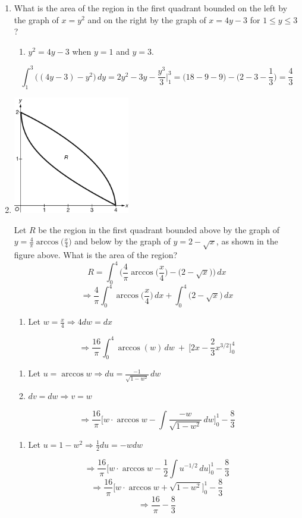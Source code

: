 \documentclass[12pt]{article}
\begin{document}
\begin{enumerate}
    \item What is the area of the region in the first quadrant bounded on the left by the graph of $x=y^2$ and on the right by the graph of $x=4y-3$ for $1\leq y \leq3$?
    \begin{enumerate}
        \item $y^2=4y-3$ when $y=1$ and $y=3$.
    \end{enumerate}
    $$\int_{1}^{3} \big((4y-3)-y^2\big) \, dy = 2y^2-3y-\frac{y^3}{3}\biggr\rvert_{1}^{3} = \biggr(18-9-9\biggr) - \biggr(2-3-\frac{1}{3}\biggr) = \boxed{\frac{4}{3}}$$
    \item 
    \begin{center}
        \includegraphics[width=2in]{4.011.png}
    \end{center}
    Let $R$ be the region in the first quadrant bounded above by the graph of $y=\frac{4}{\pi}\arccos\big( \frac{x}{4}\big)$ and below by the graph of $y=2-\sqrt{x}$, as shown in the figure above. What is the area of the region?
    $$R = \int_{0}^{4} \biggr(\frac{4}{\pi}\arccos\biggr( \frac{x}{4}\biggr) - \big(2-\sqrt{x}\big) \biggr) \, dx$$
$$\Longrightarrow \frac{4}{\pi}\int_{0}^{4} \arccos\biggr( \frac{x}{4}\biggr) \, dx + \int_{0}^{4} \big(2-\sqrt{x}\big) \, dx$$
\begin{enumerate}
    \item Let $w=\frac{x}{4} \Longrightarrow 4 dw=dx$
\end{enumerate}
$$\Longrightarrow \frac{16}{\pi}\int_{0}^{4} \arccos (w) \, dw \: + \: \biggr[2x-\frac{2}{3}x^{3/2} \biggr]_{0}^{4}$$
\begin{enumerate}[resume]
    \item Let $u=\arccos w \Longrightarrow  du=\frac{-1}{\sqrt{1-w^2}} \, dw$
    \item $dv=dw \Longrightarrow v=w$
\end{enumerate}
$$\Longrightarrow \frac{16}{\pi}\biggr[w \cdot \arccos w - \int \frac{-w}{\sqrt{1-w^2}} \, dw  \biggr]_{0}^{1} - \frac{8}{3}$$
\begin{enumerate}[resume]
\item Let $u= 1-w^2 \Longrightarrow \frac{1}{2} du = -w dw $
\end{enumerate}
$$\Longrightarrow\frac{16}{\pi}\biggr[w \cdot \arccos w - \frac{1}{2} \int u^{-1/2} \, du  \biggr]_{0}^{1} - \frac{8}{3}$$
$$\Longrightarrow\frac{16}{\pi}\biggr[w \cdot \arccos w  + \sqrt{1-w^2}  \biggr]_{0}^{1} - \frac{8}{3}$$
$$\Longrightarrow \boxed{\frac{16}{\pi}- \frac{8}{3}}$$
    

\end{enumerate}
\end{document}

